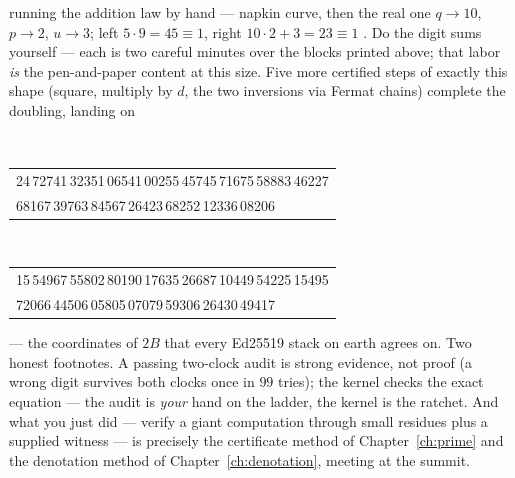 \begin{worked}{running the addition law by hand --- napkin curve, then the real one}
$q \to 10$, $p \to 2$, $u \to 3$; left $5 \cdot 9 = 45 \equiv 1$, right
$10 \cdot 2 + 3 = 23 \equiv 1$ \checkmark. Do the digit sums yourself ---
each is two careful minutes over the blocks printed above; that labor
\emph{is} the pen-and-paper content at this size. Five more certified
steps of exactly this shape (square, multiply by $d$, the two inversions
via Fermat chains) complete the doubling, landing on
\par{}\\[-2pt]
{\footnotesize\ttfamily\begin{tabular}{@{}l@{}}24\,72741\,32351\,06541\,00255\,45745\,71675\,58883\,46227\\
68167\,39763\,84567\,26423\,68252\,12336\,08206\end{tabular}}\par\smallskip
\par{}\\[-2pt]
{\footnotesize\ttfamily\begin{tabular}{@{}l@{}}15\,54967\,55802\,80190\,17635\,26687\,10449\,54225\,15495\\
72066\,44506\,05805\,07079\,59306\,26430\,49417\end{tabular}}\par\smallskip
--- the coordinates of $2B$ that every Ed25519 stack on earth agrees on.
Two honest footnotes. A passing two-clock audit is strong evidence, not
proof (a wrong digit survives both clocks once in $99$ tries); the kernel
checks the exact equation --- the audit is \emph{your} hand on the
ladder, the kernel is the ratchet. And what you just did --- verify a
giant computation through small residues plus a supplied witness --- is
precisely the certificate method of Chapter~\ref{ch:prime} and the
denotation method of Chapter~\ref{ch:denotation}, meeting at the summit.
\end{worked}

